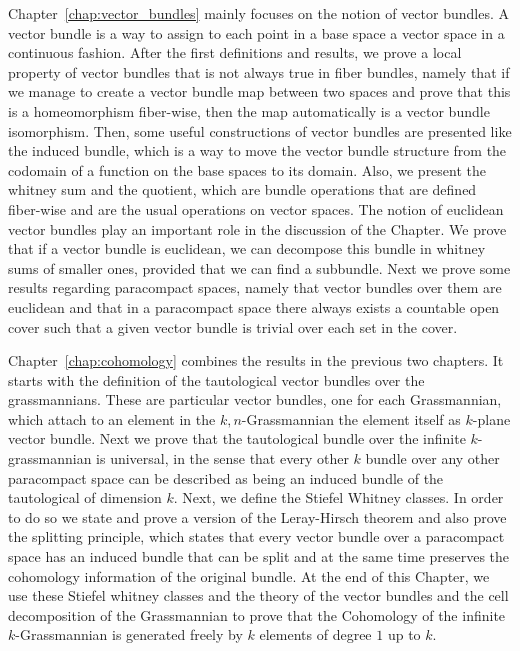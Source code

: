 Chapter~\ref{chap:vector_bundles} mainly focuses on the notion of vector bundles. A vector bundle is a way to assign to each point in a base space a vector space in a continuous fashion. After the first definitions and results, we prove a local property of vector bundles that is not always true in fiber bundles, namely that if we manage to create a vector bundle map between two spaces and prove that this is a homeomorphism fiber-wise, then the map automatically is a vector bundle isomorphism. Then, some useful constructions of vector bundles are presented like the induced bundle, which is a way to move the vector bundle structure from the codomain of a function on the base spaces to its domain. Also, we present the whitney sum and the quotient, which are bundle operations that are defined fiber-wise and are the usual operations on vector spaces. The notion of euclidean vector bundles play an important role in the discussion of the Chapter. We prove that if a vector bundle is euclidean, we can decompose this bundle in whitney sums of smaller ones, provided that we can find a subbundle. Next we prove some results regarding paracompact spaces, namely that vector bundles over them are euclidean and that in a paracompact space there always exists a countable open cover such that a given vector bundle is trivial over each set in the cover.

Chapter~\ref{chap:cohomology} combines the results in the previous two chapters. It starts with the definition of the tautological vector bundles over the grassmannians. These are particular vector bundles, one for each Grassmannian, which attach to an element in the $k,n$-Grassmannian the element itself as $k$-plane vector bundle. Next we prove that the tautological bundle over the infinite $k$-grassmannian is universal, in the sense that every other $k$ bundle over any other paracompact space can be described as being an induced bundle of the tautological of dimension $k$. Next, we define the Stiefel Whitney classes. In order to do so we state and prove a version of the Leray-Hirsch theorem and also prove the splitting principle, which states that every vector bundle over a paracompact space has an induced bundle that can be split and at the same time preserves the cohomology information of the original bundle. At the end of this Chapter, we use these Stiefel whitney classes and the theory of the vector bundles and the cell decomposition of the Grassmannian to prove that the Cohomology of the infinite $k$-Grassmannian is generated freely by $k$ elements of degree $1$ up to $k$.
